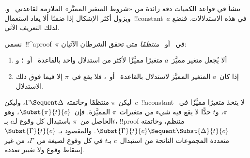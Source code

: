 \documentclass[../../../include/open-logic-section]{subfiles}
\begin{document}


تنشأ في قواعد الكميات دقة زائدة من «شروط المتغير المميَّز» الملازمة
لقاعدتي~\LeftR{\lexists} و\RightR{\lforall}. ويزول أكثر الإشكال إذا
ضمنّا ألا يعاد استعمال~!!{constant}~$a$ في هذه الاستدلالات. فنضع لذلك
التعريف الآتي.

\begin{defn}
نسمي~!!^a{proof}~$\pi$ في~ أو~ \emph{منتظمًا} متى تحقق
الشرطان الآتيان:
\begin{enumerate}
  \item ألا يُجعل متغير مميَّز~$a$ متغيرًا مميَّزًا لأكثر من استدلال
  واحد بالقاعدة~\LeftR{\lexists} أو~\RightR{\lforall}؛ و
  \item إذا كان~$a$ المتغير المميَّز لاستدلال بالقاعدة~\LeftR{\lexists}
  أو~\RightR{\lforall}، فلا يقع في~$\pi$ إلا فيما فوق ذلك الاستدلال.
\end{enumerate}
\end{defn}

\begin{lem} ليكن~$\pi$ منتظمًا وخاتمته
$\Gamma \Sequent \Delta$، وليكن~$c$~!!a{constant} لا يتخذ متغيرًا
مميَّزًا في~$\pi$، و$ t$ حدًّا لا يقع فيه شيء من متغيرات~$\pi$ المميَّزة.
فإن~$\Subst{\pi}{t}{c}$، وهو الحاصل من~$\pi$ باستبدال كل وقوع لـ$c$ بـ$t$،
!!{proof} منتظم، وخاتمته
$\Subst{\Gamma}{t}{c} \Sequent \Subst{\Delta}{t}{c}$. والمقصود بـ
$\Subst{\Gamma}{t}{c}$ متعددة المجموعات الناتجة من استبدال~$c$ بـ$t$
في كل وقوع لصيغة من~$\Gamma$، من غير إسقاط وقوع ولا تغيير تعدده.
\end{lem}
\end{document}
